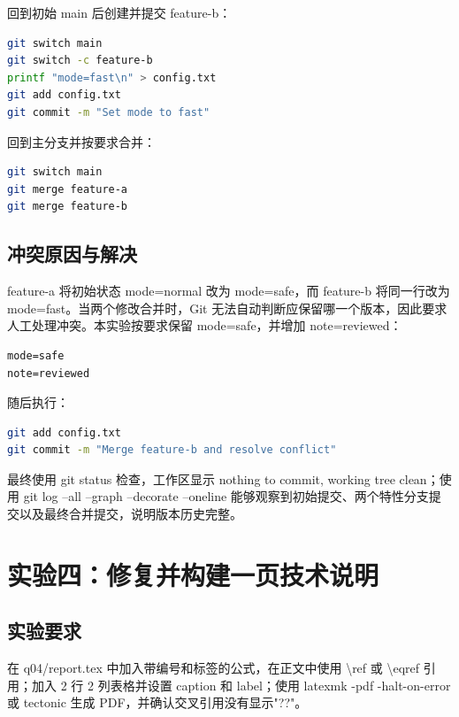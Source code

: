 \documentclass[UTF8]{ctexart}
\begin{document}
回到初始 main 后创建并提交 feature-b：

\begin{lstlisting}[language=bash]
git switch main
git switch -c feature-b
printf "mode=fast\n" > config.txt
git add config.txt
git commit -m "Set mode to fast"
\end{lstlisting}

回到主分支并按要求合并：

\begin{lstlisting}[language=bash]
git switch main
git merge feature-a
git merge feature-b
\end{lstlisting}

\subsection{冲突原因与解决}

feature-a 将初始状态 mode=normal 改为 mode=safe，而 feature-b 将同一行改为 mode=fast。当两个修改合并时，Git 无法自动判断应保留哪一个版本，因此要求人工处理冲突。本实验按要求保留 mode=safe，并增加 note=reviewed：

\begin{lstlisting}
mode=safe
note=reviewed
\end{lstlisting}

随后执行：

\begin{lstlisting}[language=bash]
git add config.txt
git commit -m "Merge feature-b and resolve conflict"
\end{lstlisting}

最终使用 git status 检查，工作区显示 nothing to commit, working tree clean；使用 git log --all --graph --decorate --oneline 能够观察到初始提交、两个特性分支提交以及最终合并提交，说明版本历史完整。

\section{实验四：修复并构建一页技术说明}

\subsection{实验要求}

在 q04/report.tex 中加入带编号和标签的公式，在正文中使用 \textbackslash ref 或 \textbackslash eqref 引用；加入 2 行 2 列表格并设置 caption 和 label；使用 latexmk -pdf -halt-on-error 或 tectonic 生成 PDF，并确认交叉引用没有显示"??"。
\end{document}
